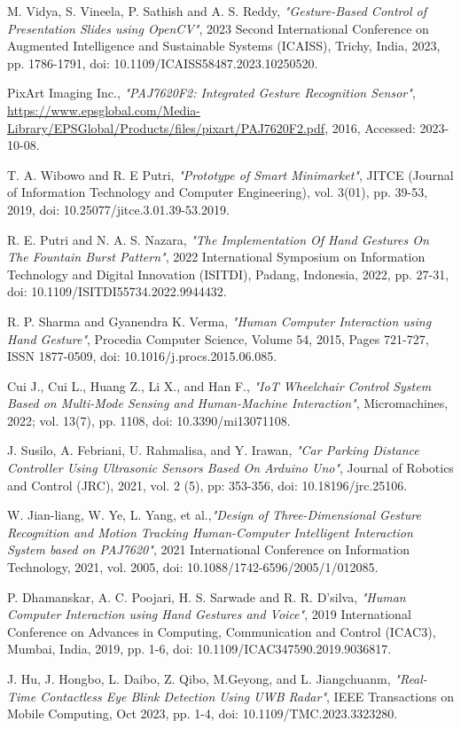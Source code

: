 \documentclass[conference,a4paper]{IEEEtran}
\begin{document}
\vspace{7pt}
\begin{thebibliography}{1}

M. Vidya, S. Vineela, P. Sathish and A. S. Reddy, \emph{"Gesture-Based Control of Presentation Slides using OpenCV"}, 2023 Second International Conference on Augmented Intelligence and Sustainable Systems (ICAISS), Trichy, India, 2023, pp. 1786-1791, doi: 10.1109/ICAISS58487.2023.10250520.

PixArt Imaging Inc., \emph{"PAJ7620F2: Integrated Gesture Recognition Sensor"}, \url{https://www.epsglobal.com/Media-Library/EPSGlobal/Products/files/pixart/PAJ7620F2.pdf}, 
2016, Accessed: 2023-10-08.

T. A. Wibowo and R. E Putri, \emph{"Prototype of Smart Minimarket"}, JITCE (Journal of Information Technology and Computer Engineering), vol. 3(01), pp. 39-53, 2019, doi: 10.25077/jitce.3.01.39-53.2019.

R. E. Putri and N. A. S. Nazara, \emph{"The Implementation Of Hand Gestures On The Fountain Burst Pattern"}, 2022 International Symposium on Information Technology and Digital Innovation (ISITDI), Padang, Indonesia, 2022, pp. 27-31, doi: 10.1109/ISITDI55734.2022.9944432.

R. P. Sharma and Gyanendra K. Verma, \emph{"Human Computer Interaction using Hand Gesture"}, Procedia Computer Science, Volume 54, 2015, Pages 721-727, ISSN 1877-0509, doi: 10.1016/j.procs.2015.06.085.

Cui J., Cui L., Huang Z., Li X., and Han F., \emph{"IoT Wheelchair Control System Based on Multi-Mode Sensing and Human-Machine Interaction"}, Micromachines, 2022; vol. 13(7), pp. 1108, doi: 10.3390/mi13071108.
  
J. Susilo, A. Febriani, U. Rahmalisa, and Y. Irawan, \emph{"Car Parking Distance Controller Using Ultrasonic Sensors Based On Arduino Uno"}, Journal of Robotics and Control (JRC), 2021, vol. 2 (5), pp: 353-356, doi: 10.18196/jrc.25106. 

W. Jian-liang, W. Ye, L. Yang, et al.,\emph{"Design of Three-Dimensional Gesture Recognition and Motion Tracking Human-Computer Intelligent Interaction System based on PAJ7620"}, 2021 International Conference on Information Technology, 2021, vol. 2005, doi: 10.1088/1742-6596/2005/1/012085.

P. Dhamanskar, A. C. Poojari, H. S. Sarwade and R. R. D'silva, \emph{"Human Computer Interaction using Hand Gestures and Voice"}, 2019 International Conference on Advances in Computing, Communication and Control (ICAC3), Mumbai, India, 2019, pp. 1-6, doi: 10.1109/ICAC347590.2019.9036817.

J. Hu, J. Hongbo, L. Daibo, Z. Qibo, M.Geyong, and L. Jiangchuanm, \emph{"Real-Time Contactless Eye Blink Detection Using UWB Radar"}, IEEE Transactions on Mobile Computing, Oct 2023, pp. 1-4, doi: 10.1109/TMC.2023.3323280.

\end{thebibliography}
\end{document}
